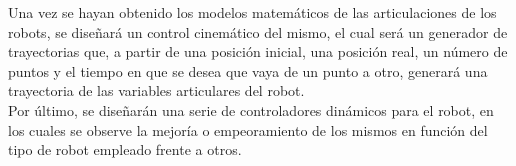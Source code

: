 \documentclass[a4paper,twoside]{article}
\begin{document}
Una vez se hayan obtenido los modelos matemáticos de las articulaciones de los robots, se diseñará un control cinemático del mismo, el cual será un generador de trayectorias que, a partir de una posición inicial, una posición real, un número de puntos y el tiempo en que se desea que vaya de un punto a otro, generará una trayectoria de las variables articulares del robot.\\

Por último, se diseñarán una serie de controladores dinámicos para el robot, en los cuales se observe la mejoría o empeoramiento de los mismos en función del tipo de robot empleado frente a otros.
\newpage

\newpage	

\newpage

\newpage

\newpage

\end{document}
